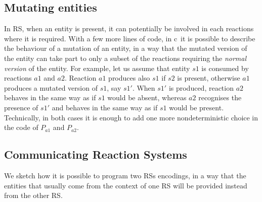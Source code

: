 \subsection{Mutating entities} 
In RS, when an entity is present, it can potentially be involved in each reactions where it is required.
With a few more lines of code, in c\CNA~it is possible to describe the behaviour of a mutation of 
an entity, in a way that the mutated version of the entity can take 
part to only a subset of the reactions requiring  the  \emph{normal version} of the entity.
For example, let us assume that entity $s1$ is consumed by reactions $a1$ and $a2$.
Reaction $a1$ produces also $s1$ if $s2$ is present, otherwise $a1$ produces a mutated version of $s1$, 
say $s1'$.
When $s1'$ is produced, reaction $a2$ behaves in the same way as if $s1$ would be absent, whereas $a2$
recognises the presence of $s1'$ and behaves in the same way as if $s1$ would be present.
Technically, in both cases it is enough to add one more nondeterministic choice in the code of $P_{a1}$ and $P_{a2}$. 


\subsection{Communicating Reaction Systems}
\label{subsec:comRS}
We sketch how it is possible to program two RSs encodings, in a way that
the entities that usually come from the context of one RS will be provided instead from the other RS.


